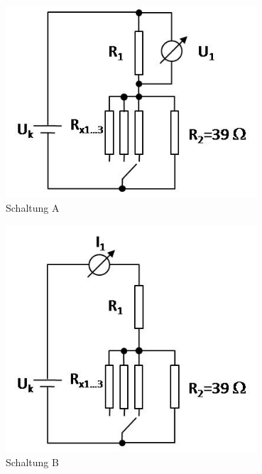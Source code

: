 \begin{minipage}[b]{0.5\textwidth}
 \centering
 \includegraphics[width=0.7\textwidth]{Versuch_13-14/Abbildungen/SchaltungA.jpg}\\
 Schaltung A
\end{minipage}
%
\begin{minipage}[b]{0.5\textwidth}
 \centering
 \includegraphics[width=0.7\textwidth]{Versuch_13-14/Abbildungen/SchaltungB.jpg}\\
 Schaltung B
\end{minipage}

